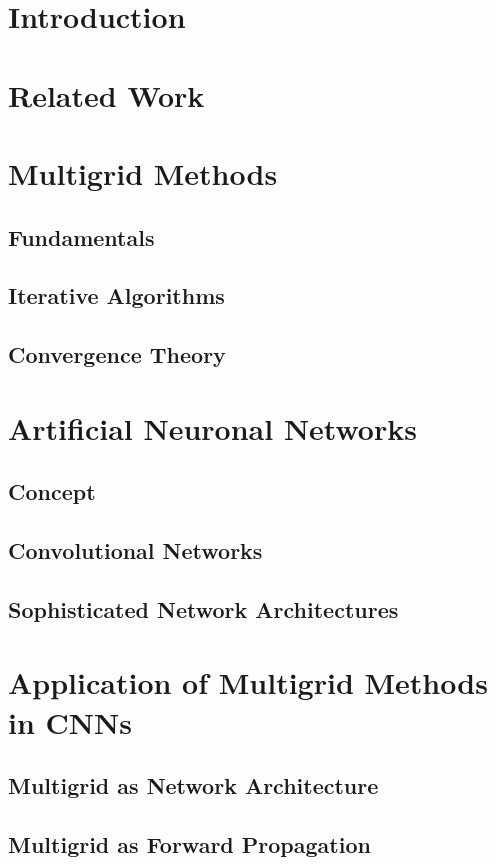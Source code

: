 \documentclass[a4paper,12pt,titlepage,enabledeprecatedfontcommands]{scrreprt}
\begin{document}
\tableofcontents
\listoffigures

\newpage
\setcounter{page}{1}

\chapter{Introduction}
\chapter{Related Work}
\chapter{Multigrid Methods}
\section{Fundamentals}
\section{Iterative Algorithms}
\section{Convergence Theory}
\chapter{Artificial Neuronal Networks}
\section{Concept}
\section{Convolutional Networks}
\section{Sophisticated Network Architectures}
\chapter{Application of Multigrid Methods in CNNs}
\section{Multigrid as Network Architecture}
\section{Multigrid as Forward Propagation}
\end{document}
